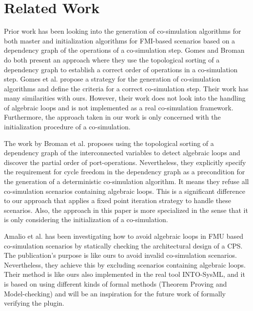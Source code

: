 \section{Related Work}
Prior work \cite{Gomes2019, BromanCompositionCo-Simulation} has been looking into the generation of co-simulation algorithms for both master and initialization algorithms for FMI-based scenarios based on a dependency graph of the operations of a co-simulation step. Gomes and Broman do both present an approach where they use the topological sorting of a dependency graph to establish a correct order of operations in a co-simulation step.
Gomes et al. \cite{Gomes2019} propose a strategy for the generation of co-simulation algorithms and define the criteria for a correct co-simulation step. Their work has many similarities with ours. However, their work does not look into the handling of algebraic loops and is not implemented as a real co-simulation framework. Furthermore, the approach taken in our work is only concerned with the initialization procedure of a co-simulation.

The work by Broman et al. \cite{BromanCompositionCo-Simulation} proposes using the topological sorting of a dependency graph of the interconnected variables to detect algebraic loops and discover the partial order of port-operations. Nevertheless, they explicitly specify the requirement for cycle freedom in the dependency graph as a precondition for the generation of a deterministic co-simulation algorithm. It means they refuse all co-simulation scenarios containing algebraic loops. This is a significant difference to our approach that applies a fixed point iteration strategy to handle these scenarios. Also, the approach in this paper is more specialized in the sense that it is only considering the initialization of a co-simulation. 

Amalio et al. \cite{Amalio2016CheckingCo-simulation} has been investigating how to avoid algebraic loops in FMU based co-simulation scenarios by statically checking the architectural design of a CPS. The publication's purpose is like ours to avoid invalid co-simulation scenarios. Nevertheless, they achieve this by excluding scenarios containing algebraic loops. Their method is like ours also implemented in the real tool INTO-SysML, and it is based on using different kinds of formal methods (Theorem Proving and Model-checking) and will be an inspiration for the future work of formally verifying the plugin. 
